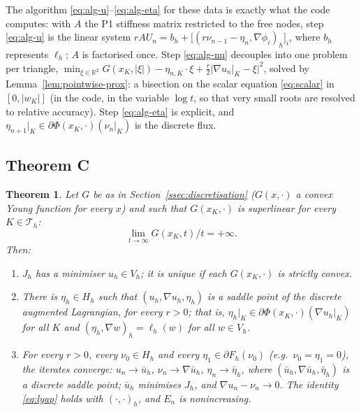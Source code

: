 \documentclass[11pt]{amsart}
\newtheorem{maintheorem}{Theorem}
\theoremstyle{definition}
\theoremstyle{remark}
\numberwithin{equation}{section}
\newcommand{\R}{\mathbb{R}}
\newcommand{\abs}[1]{\lvert #1\rvert}
\begin{document}
The algorithm \eqref{eq:alg-u}--\eqref{eq:alg-eta} for these data is exactly what the code computes: with $A$ the P1 stiffness matrix restricted to the free nodes, step \eqref{eq:alg-u} is the linear system $rAU_n=b_h+\big[(r\nu_{n-1}-\eta_n,\nabla\phi_i)_h\big]_i$, where $b_h$ represents $\ell_h$; $A$ is factorised once. Step \eqref{eq:alg-nu} decouples into one problem per triangle, $\min_{\xi\in\R^2}G(x_K,\abs\xi)-\eta_{n,K}\cdot\xi+\frac r2\abs{\nabla u_n|_K-\xi}^2$, solved by Lemma~\ref{lem:pointwise-prox}: a bisection on the scalar equation \eqref{eq:scalar} in $[0,\abs{w_K}]$ (in the code, in the variable $\log t$, so that very small roots are resolved to relative accuracy). Step \eqref{eq:alg-eta} is explicit, and $\eta_{n+1}|_K\in\partial\Phi(x_K,\cdot)(\nu_n|_K)$ is the discrete flux.

\subsection{Theorem C}
\begin{maintheorem}\label{thm:C}
Let $G$ be as in Section~\ref{ssec:discretisation} \textup($G(x,\cdot)$ a convex Young function for every $x$\textup) and such that $G(x_K,\cdot)$ is superlinear for every $K\in\mathcal T_h$:
\begin{equation}\label{eq:superlinear}
\lim_{t\to\infty}G(x_K,t)/t=+\infty .
\end{equation}
Then:
\begin{enumerate}[label=\textup{(\roman*)}]
\item $J_h$ has a minimiser $u_h\in V_h$; it is unique if each $G(x_K,\cdot)$ is strictly convex.
\item There is $\eta_h\in H_h$ such that $(u_h,\nabla u_h,\eta_h)$ is a saddle point of the discrete augmented Lagrangian, for every $r>0$; that is, $\eta_h|_K\in\partial\Phi(x_K,\cdot)(\nabla u_h|_K)$ for all $K$ and $(\eta_h,\nabla w)_h=\ell_h(w)$ for all $w\in V_h$.
\item For every $r>0$, every $\nu_0\in H_h$ and every $\eta_1\in\partial F_h(\nu_0)$ \textup(e.g.\ $\nu_0=\eta_1=0$\textup), the iterates converge: $u_n\to\bar u_h$, $\nu_n\to\nabla\bar u_h$, $\eta_n\to\bar\eta_h$, where $(\bar u_h,\nabla\bar u_h,\bar\eta_h)$ is a discrete saddle point; $\bar u_h$ minimises $J_h$, and $\nabla u_n-\nu_n\to0$. The identity \eqref{eq:lyap} holds with $(\cdot,\cdot)_h$, and $E_n$ is nonincreasing.
\end{enumerate}
\end{maintheorem}
\end{document}
